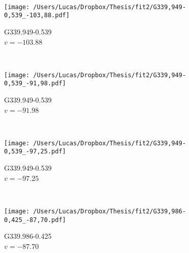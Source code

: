 \begin{figure*}[t]
\begin{subfigure}[t]{0.3\textwidth}
	\end{subfigure}
	~
	\begin{subfigure}[t]{0.3\textwidth}
		\texttt{[image: /Users/Lucas/Dropbox/Thesis/fit2/G339,949-0,539\_-103,88.pdf]}
		\caption[]{G339.949-0.539\\$v=-103.88$\,\kms}
	\end{subfigure}
	~
	\begin{subfigure}[t]{0.3\textwidth}
		\texttt{[image: /Users/Lucas/Dropbox/Thesis/fit2/G339,949-0,539\_-91,98.pdf]}
		\caption[]{G339.949-0.539\\$v=-91.98$\,\kms}
	\end{subfigure}
	~
	\begin{subfigure}[t]{0.3\textwidth}
		\texttt{[image: /Users/Lucas/Dropbox/Thesis/fit2/G339,949-0,539\_-97,25.pdf]}
		\caption[]{G339.949-0.539\\$v=-97.25$\,\kms}
	\end{subfigure}
	~
	\begin{subfigure}[t]{0.3\textwidth}
		\texttt{[image: /Users/Lucas/Dropbox/Thesis/fit2/G339,986-0,425\_-87,70.pdf]}
		\caption[]{G339.986-0.425\\$v=-87.70$\,\kms}
	\end{subfigure}
	~
\end{figure*}
\clearpage
